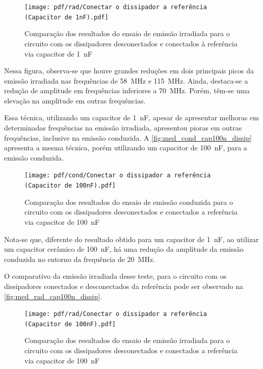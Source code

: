     \begin{figure}[H]
    	\centering
    	\caption{Comparação dos resultados do ensaio de emissão irradiada para o circuito com os dissipadores desconectados e conectados à referência via capacitor de \SI{1}{\nano\farad}}
    	\texttt{[image: pdf/rad/Conectar o dissipador a referência (Capacitor de 1nF).pdf]}
    	\label{fig:med_rad_cap1n_dissip}
    \end{figure}
    
    Nessa figura, observa-se que houve grandes reduções em dois principais picos da emissão irradiada nas frequências de \SI{58}{\mega\hertz} e \SI{115}{\mega\hertz}. Ainda, destaca-se a redução de amplitude em frequências inferiores a \SI{70}{\mega\hertz}. Porém, têm-se uma elevação na amplitude em outras frequências. 
    
    Essa técnica, utilizando um capacitor de \SI{1}{\nano\farad}, apesar de apresentar melhoras em determinadas frequências na emissão irradiada, apresentou pioras em outras frequências, inclusive na emissão conduzida. A \autoref{fig:med_cond_cap100n_dissip} apresenta a mesma técnica, porém utilizando um capacitor de \SI{100}{\nano\farad}, para a emissão conduzida.
    
    \begin{figure}[H]
    	\centering
    	\caption{Comparação dos resultados do ensaio de emissão conduzida para o circuito com os dissipadores desconectados e conectados a referência via capacitor de \SI{100}{\nano\farad}}
    	\texttt{[image: pdf/cond/Conectar o dissipador a referência (Capacitor de 100nF).pdf]}
    	\label{fig:med_cond_cap100n_dissip}
    \end{figure}
    
    Nota-se que, diferente do resultado obtido para um capacitor de \SI{1}{\nano\farad}, ao utilizar um capacitor cerâmico de \SI{100}{\nano\farad}, há uma redução da amplitude da emissão conduzida no entorno da frequência de \SI{20}{\mega\hertz}. 
    
    O comparativo da emissão irradiada desse teste, para o circuito com os dissipadores conectados e desconectados da referência pode ser observado na \autoref{fig:med_rad_cap100n_dissip}.
    
    \begin{figure}[H]
    	\centering
    	\caption{Comparação dos resultados do ensaio de emissão irradiada para o circuito com os dissipadores desconectados e conectados a referência via capacitor de \SI{100}{\nano\farad}}
    	\texttt{[image: pdf/rad/Conectar o dissipador a referência (Capacitor de 100nF).pdf]}
    	\label{fig:med_rad_cap100n_dissip}
    \end{figure}
    
